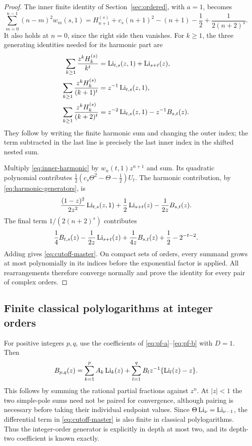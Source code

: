 \begin{proof}
The inner finite identity of Section~\ref{sec:ordered}, with $a=1$,
becomes
\begin{equation}\label{eq:inner-harmonic}
 \sum_{m=0}^{n-1}(n-m)^2w_m(s,1)
 =H_{n+1}^{(s)}+c_s(n+1)^2-(n+1)-\frac12
   +\frac1{2(n+2)^s}.
\end{equation}
It also holds at $n=0$, since the right side then vanishes.
For $k\ge1$, the three generating identities needed for its harmonic
part are
\begin{align}
 \sum_{k\ge1}\frac{z^kH_k^{(s)}}{k^t}
   &=\operatorname{Li}_{t,s}(z,1)+\operatorname{Li}_{s+t}(z),\notag\\
 \sum_{k\ge1}\frac{z^kH_k^{(s)}}{(k+1)^t}
   &=z^{-1}\operatorname{Li}_{t,s}(z,1),\notag\\
 \sum_{k\ge1}\frac{z^kH_k^{(s)}}{(k+2)^t}
   &=z^{-2}\operatorname{Li}_{t,s}(z,1)-z^{-1}B_{s,t}(z).
 \label{eq:harmonic-generators}
\end{align}
They follow by writing the finite harmonic sum and changing the
outer index; the term subtracted in the last line is precisely the
last inner index in the shifted nested sum.

Multiply \eqref{eq:inner-harmonic} by $w_n(t,1)z^{n+1}$ and sum.
Its quadratic polynomial contributes
$\tfrac12(c_s\Theta^2-\Theta-\tfrac12)U_t$.
The harmonic contribution, by \eqref{eq:harmonic-generators}, is
\[
 \frac{(1-z)^2}{2z^2}\operatorname{Li}_{t,s}(z,1)
 +\frac12\operatorname{Li}_{s+t}(z)-\frac1{2z}B_{s,t}(z).
\]
The final term $1/(2(n+2)^s)$ contributes
\[
 \frac14B_{t,s}(z)-\frac1{2z}\operatorname{Li}_{s+t}(z)
 +\frac1{4z}B_{s,t}(z)+\frac12-2^{-t-2}.
\]
Adding gives \eqref{eq:cutoff-master}. On compact sets of orders,
every summand grows at most polynomially in its indices before the
exponential factor is applied. All rearrangements therefore converge
normally and prove the identity for every pair of complex orders.
\end{proof}

\subsection{Finite classical polylogarithms at integer orders}

For positive integers $p,q$, use the coefficients of
\eqref{eq:pf-a}--\eqref{eq:pf-b} with $D=1$. Then
\begin{equation}\label{eq:b-classical}
 B_{p,q}(z)=\sum_{k=1}^{p}A_k\operatorname{Li}_k(z)
 +\sum_{l=1}^{q}B_lz^{-1}\{\operatorname{Li}_l(z)-z\}.
\end{equation}
This follows by summing the rational partial fractions against $z^n$.
At $|z|<1$ the two simple-pole sums need not be paired for convergence,
although pairing is necessary before taking their individual endpoint
values. Since $\Theta\operatorname{Li}_\nu=\operatorname{Li}_{\nu-1}$, the differential term in
\eqref{eq:cutoff-master} is also finite in classical polylogarithms.
Thus the integer-order generator is explicitly in depth at most two,
and its depth-two coefficient is known exactly.

